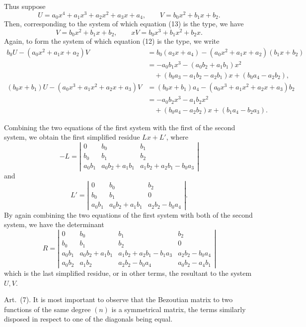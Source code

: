 \documentclass[11pt]{article}
\newcommand{\sourcepage}[1]{\marginpar{\scriptsize p.~#1}}
\newcommand{\art}[1]{\par\smallskip\noindent Art.~(#1).\quad}
\begin{document}
Thus suppose
\[
U=a_0x^4+a_1x^3+a_2x^2+a_3x+a_4,\qquad
V=b_0x^2+b_1x+b_2.
\]
Then, corresponding to the system of which equation (13) is the type, we have
\[
V=b_0x^2+b_1x+b_2,\qquad
xV=b_0x^3+b_1x^2+b_2x.
\]
Again, to form the system of which equation (12) is the type, we write
\[
\begin{aligned}
b_0U-(a_0x^2+a_1x+a_2)V
&=b_0(a_3x+a_4)-(a_0x^2+a_1x+a_2)(b_1x+b_2)\\
&=-a_0b_1x^3-(a_0b_2+a_1b_1)x^2\\
&\quad +(b_0a_3-a_1b_2-a_2b_1)x+(b_0a_4-a_2b_2),\\
(b_0x+b_1)U-(a_0x^3+a_1x^2+a_2x+a_3)V
&=(b_0x+b_1)a_4-(a_0x^3+a_1x^2+a_2x+a_3)b_2\\
&=-a_0b_2x^3-a_1b_2x^2\\
&\quad +(b_0a_4-a_2b_2)x+(b_1a_4-b_2a_3).
\end{aligned}
\]

\sourcepage{447}
Combining the two equations of the first system with the first of the second system, we obtain the first simplified residue $Lx+L'$, where
\[
-L=
\left|\begin{array}{ccc}
0&b_0&b_1\\
b_0&b_1&b_2\\
a_0b_1&a_0b_2+a_1b_1&a_1b_2+a_2b_1-b_0a_3
\end{array}\right|
\]
and
\[
L'=
\left|\begin{array}{ccc}
0&b_0&b_2\\
b_0&b_1&0\\
a_0b_1&a_0b_2+a_1b_1&a_2b_2-b_0a_4
\end{array}\right|.
\]
By again combining the two equations of the first system with both of the second system, we have the determinant
\[
R=\left|\begin{array}{cccc}
0&b_0&b_1&b_2\\
b_0&b_1&b_2&0\\
a_0b_1&a_0b_2+a_1b_1&a_1b_2+a_2b_1-b_1a_3&a_2b_2-b_0a_4\\
a_0b_2&a_1b_2&a_2b_2-b_0a_4&a_0b_2-a_4b_1
\end{array}\right|
\]
which is the last simplified residue, or in other terms, the resultant to the system $U,V$.

\art{7} It is most important to observe that the Bezoutian matrix to two functions of the same degree $(n)$ is a symmetrical matrix, the terms similarly disposed in respect to one of the diagonals being equal.
\end{document}
